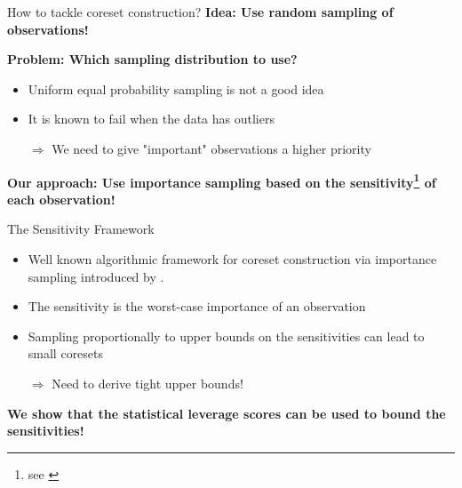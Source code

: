 \documentclass[gray]{beamer}
\begin{document}
\begin{frame}{How to tackle coreset construction?}
    \textbf{Idea: Use random sampling of observations!}

    \vspace{\fill}

    \textbf{Problem: Which sampling distribution to use?}
    \begin{itemize}
        \item Uniform equal probability sampling is not a good idea
        \item It is known to fail when the data has outliers
        \item[$\Rightarrow$] We need to give "important" observations a
              higher priority
    \end{itemize}

    \vspace{\fill}

    \textbf{Our approach: Use importance sampling based on the
        sensitivity\footnote{see \cite{langberg-schulman-sensitivities}} of each observation!}
\end{frame}

\begin{frame}{The Sensitivity Framework}

    \begin{itemize}
        \item Well known algorithmic framework for coreset construction via
              importance sampling introduced by \cite{feldman-langberg-coresets}.
        \item The sensitivity is the worst-case importance of an observation
        \item Sampling proportionally to upper bounds on the sensitivities
              can lead to small coresets
        \item[$\Rightarrow$] Need to derive tight upper bounds!
    \end{itemize}

    \vspace{\fill}

    \textbf{We show that the statistical leverage scores can be
        used to bound the sensitivities!}

\end{frame}
\end{document}
